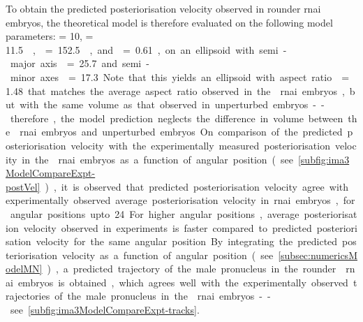 To obtain the predicted posteriorisation velocity observed in rounder  \ac{rnai} embryos, the theoretical model is therefore evaluated on the following model parameters: \hydrodynamicLength = \SI{10}{\unitLength}, \activeRelaxLength = \SI{11.5}{\square\unitLength\per\second}, \nematicLength = \SI{152.5}{\square\unitLength\per\second}, and \dragCoefficient = \num{0.61}, on an ellipsoid with semi-major axis \longAxisLength = \SI{25.7}{\unitLength} and semi-minor axes \shortAxisLength = \SI{17.3}{\unitLength}. Note that this yields an ellipsoid with aspect ratio \aspectRatio = \num{1.48} that matches the average aspect ratio observed in the  \ac{rnai} embryos, but with the same volume as that observed in unperturbed embryos -- therefore, the model prediction neglects the difference in volume between the  \ac{rnai} embryos and unperturbed embryos. On comparison of the predicted posteriorisation velocity with the experimentally measured posteriorisation velocity in the  \ac{rnai} embryos as a function of angular position (see \autoref{subfig:ima3ModelCompareExpt-postVel}), it is observed that predicted posteriorisation velocity agree with experimentally observed average posteriorisation velocity in \ac{rnai} embryos, for angular positions upto \SI{24}{\unitAngle}. For higher angular positions, average posteriorisation velocity observed in experiments is faster compared to predicted posteriorisation velocity for the same angular position. By integrating the predicted posteriorisation velocity as a function of angular position (see \autoref{subsec:numericsModelMN}), a predicted trajectory of the male pronucleus in the rounder  \ac{rnai} embryos is obtained, which agrees well with the experimentally observed trajectories of the male pronucleus in the  \ac{rnai} embryos -- see \autoref{subfig:ima3ModelCompareExpt-tracks}.

